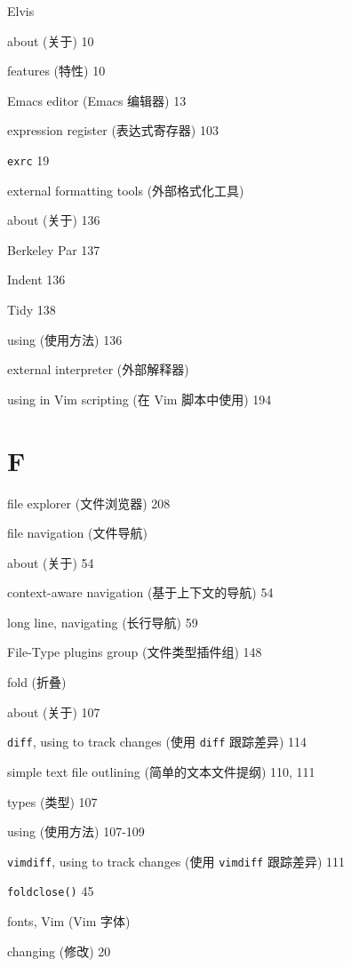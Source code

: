 \begin{multicols}{2}
Elvis \par
  about (关于) 10 \par
  features (特性) 10 \par

Emacs editor (Emacs 编辑器) 13

expression register (表达式寄存器) 103

\texttt{exrc} 19

external formatting tools (外部格式化工具) \par
  about (关于) 136 \par
  Berkeley Par 137 \par
  Indent 136 \par
  Tidy 138 \par
  using (使用方法) 136 \par

external interpreter (外部解释器) \par
  using in Vim scripting (在 Vim 脚本中使用) 194 \par

\section*{F}

file explorer (文件浏览器) 208

file navigation (文件导航) \par
  about (关于) 54 \par
  context-aware navigation (基于上下文的导航) 54 \par
  long line, navigating (长行导航) 59 \par

File-Type plugins group (文件类型插件组) 148

fold (折叠) \par
  about (关于) 107 \par
  \texttt{diff}, using to track changes (使用 \texttt{diff} 跟踪差异) 114 \par
  simple text file outlining (简单的文本文件提纲) 110, 111 \par
  types (类型) 107 \par
  using (使用方法) 107-109 \par
  \texttt{vimdiff}, using to track changes (使用 \texttt{vimdiff} 跟踪差异) 111 \par

\texttt{foldclose()} 45

fonts, Vim (Vim 字体) \par
  changing (修改) 20 \par


\end{multicols}

